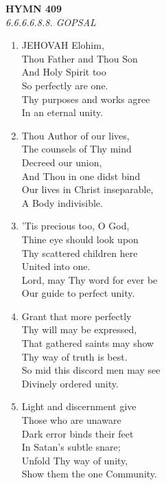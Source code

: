 \newpage
\begin{center}
    {\Large \textbf{HYMN 409}}
    \\
    \textit{6.6.6.6.8.8. GOPSAL}
\end{center}
\vspace{1em}

\begin{enumerate}
    \item JEHOVAH Elohim, \\
        Thou Father and Thou Son \\
        And Holy Spirit too \\
        So perfectly are one. \\
        Thy purposes and works agree \\
        In an eternal unity.

    \item Thou Author of our lives, \\
        The counsels of Thy mind \\
        Decreed our union, \\
        And Thou in one didst bind \\
        Our lives in Christ inseparable, \\
        A Body indivisible.

    \item 'Tis precious too, O God, \\
        Thine eye should look upon \\
        Thy scattered children here \\
        United into one. \\
        Lord, may Thy word for ever be \\
        Our guide to perfect unity.

    \item Grant that more perfectly \\
        Thy will may be expressed, \\
        That gathered saints may show \\
        Thy way of truth is best. \\
        So mid this discord men may see \\
        Divinely ordered unity.

    \item Light and discernment give \\
        Those who are unaware \\
        Dark error binds their feet \\
        In Satan's subtle snare; \\
        Unfold Thy way of unity, \\
        Show them the one Community.


\end{enumerate}
